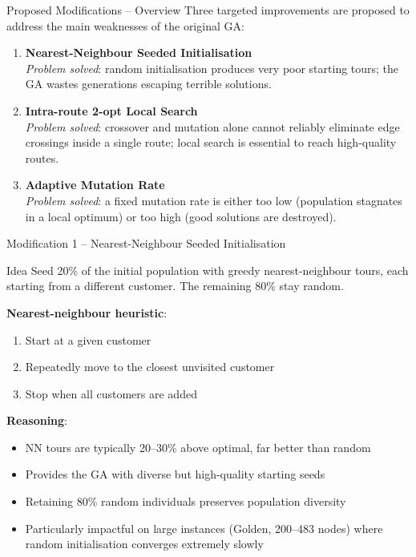 \documentclass{beamer}
\begin{document}
\begin{frame}{Proposed Modifications -- Overview}
  Three targeted improvements are proposed to address the main weaknesses
  of the original GA:

  \vspace{6pt}
  \begin{enumerate}
    \setlength{\itemsep}{8pt}
    \item \textbf{Nearest-Neighbour Seeded Initialisation}\\
          \textit{Problem solved}: random initialisation produces very poor
          starting tours; the GA wastes generations escaping terrible solutions.

    \item \textbf{Intra-route 2-opt Local Search}\\
          \textit{Problem solved}: crossover and mutation alone cannot reliably
          eliminate edge crossings inside a single route; local search is
          essential to reach high-quality routes.

    \item \textbf{Adaptive Mutation Rate}\\
          \textit{Problem solved}: a fixed mutation rate is either too low
          (population stagnates in a local optimum) or too high (good
          solutions are destroyed).
  \end{enumerate}
\end{frame}

\begin{frame}{Modification 1 -- Nearest-Neighbour Seeded Initialisation}
  \begin{block}{Idea}
    Seed 20\% of the initial population with greedy nearest-neighbour tours,
    each starting from a different customer.  The remaining 80\% stay random.
  \end{block}

  \vspace{4pt}
  \textbf{Nearest-neighbour heuristic}:
  \begin{enumerate}
    \item Start at a given customer
    \item Repeatedly move to the closest unvisited customer
    \item Stop when all customers are added
  \end{enumerate}

  \vspace{4pt}
  \textbf{Reasoning}:
  \begin{itemize}
    \item NN tours are typically 20--30\% above optimal, far better than random
    \item Provides the GA with diverse but high-quality starting seeds
    \item Retaining 80\% random individuals preserves population diversity
    \item Particularly impactful on large instances (Golden, 200--483 nodes)
          where random initialisation converges extremely slowly
  \end{itemize}
\end{frame}
\end{document}
